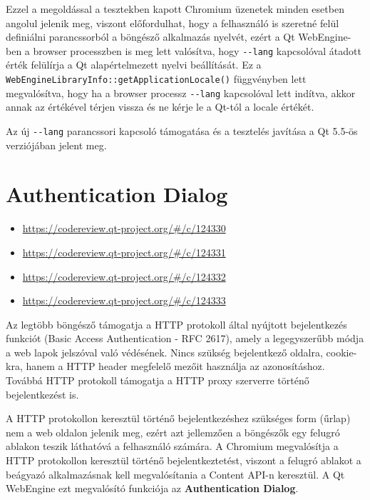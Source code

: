 \documentclass[12pt]{report}
\let\origurl\url
\renewcommand{\url}[1]{%
    \textcolor{blue}{\origurl{#1}}
}
\newcommand{\gerrit}[1]{%
    \textcolor{qtgreen}{\origurl{https://codereview.qt-project.org/\#/c/#1}}
}
\begin{document}
Ezzel a megoldással a tesztekben kapott Chromium üzenetek minden esetben angolul jelenik meg,
viszont előfordulhat, hogy a felhasználó is szeretné felül definiálni parancssorból a
böngésző alkalmazás nyelvét, ezért a Qt WebEngine-ben a browser processzben is meg lett
valósítva, hogy \texttt{-{}-lang} kapcsolóval átadott érték felülírja a Qt alapértelmezett
nyelvi beállítását. Ez a \texttt{WebEngineLibraryInfo::getApplicationLocale()} függvényben
lett megvalósítva, hogy ha a browser processz \texttt{-{}-lang} kapcsolóval lett indítva,
akkor annak az értékével térjen vissza és ne kérje le a Qt-tól a locale értékét.

Az új \texttt{-{}-lang} parancssori kapcsoló támogatása és a tesztelés javítása a Qt 5.5-ös
verziójában jelent meg.


\section{Authentication Dialog}

\begin{center}
    \begin{reviewbox}
        \begin{itemize}
            \renewcommand{\labelitemi}{\textcolor{qtgreen}{$\blacktriangleright$}}
            \item \gerrit{124330}
            \item \gerrit{124331}
            \item \gerrit{124332}
            \item \gerrit{124333}
        \end{itemize}
    \end{reviewbox}
\end{center}

\noindent
Az legtöbb böngésző támogatja a HTTP protokoll által nyújtott bejelentkezés funkciót
(Basic Access Authentication - RFC 2617), amely a legegyszerűbb módja a web lapok jelszóval
való védésének. Nincs szükség bejelentkező oldalra, cookie-kra, hanem a HTTP header
megfelelő mezőit használja az azonosításhoz. Továbbá HTTP protokoll támogatja a HTTP proxy
szerverre történő bejelentkezést is.

A HTTP protokollon keresztül történő bejelentkezéshez szükséges form (űrlap) nem a web
oldalon jelenik meg, ezért azt jellemzően a böngészők egy felugró ablakon teszik láthatóvá
a felhasználó számára. A Chromium megvalósítja a HTTP protokollon keresztül történő
bejelentkeztetést, viszont a felugró ablakot a beágyazó alkalmazásnak kell megvalósítania
a Content API-n keresztül. A Qt WebEngine ezt megvalósító funkciója az
\textbf{Authentication Dialog}.
\end{document}
